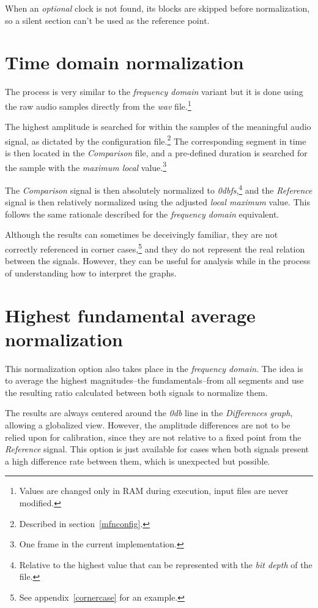 \documentclass[10pt,a4paper]{report}
\newcommand{\ac}[1]{\textit{\mbox{\acrshort{#1}}}}
\newcommand{\db}[1]{\textit{\mbox{#1\acrshort{db}}}}
\newcommand{\dbfs}[1]{\textit{\mbox{#1\acrshort{dbfs}}}}
\begin{document}
\begin{appendices}
When an \textit{optional} clock is not found, its blocks are skipped before normalization, so a silent section can't be used as the reference point.

\section{Time domain normalization}

The process is very similar to the \textit{frequency domain} variant but it is done using the raw audio samples directly from the \ac{wav} file.\footnote{Values are changed only in RAM during execution, input files are never modified.}

The highest amplitude is searched for within the samples of the meaningful audio signal, as dictated by the configuration file.\footnote{Described in section~\ref{mfnconfig}.} The corresponding segment in time is then located in the \textit{Comparison} file, and a pre-defined duration is searched for the sample with the \textit{maximum local} value.\footnote{One frame in the current implementation.}

The \textit{Comparison} signal is then absolutely normalized to \dbfs{0},\footnote{Relative to the highest value that can be represented with the \textit{bit depth} of the file.} and the \textit{Reference} signal is then relatively normalized using the adjusted \textit{local maximum} value. This follows the same rationale described for the \textit{frequency domain} equivalent.

Although the results can sometimes be deceivingly familiar, they are not correctly referenced in corner cases,\footnote{See appendix~\ref{cornercase} for an example.} and they do not represent the real relation between the signals. However, they can be useful for analysis while in the process of understanding how to interpret the graphs.

\section{Highest fundamental average normalization}

This normalization option also takes place in the \textit{frequency domain}. The idea is to average the highest magnitudes--the fundamentals--from all segments and use the resulting ratio calculated between both signals to normalize them.

The results are always centered around the \db{0} line in the \textit{Differences graph}, allowing a globalized view. However, the amplitude differences are not to be relied upon for calibration, since they are not relative to a fixed point from the \textit{Reference} signal. This option is just available for cases when both signals present a high difference rate between them, which is unexpected but possible.


\end{appendices}
\end{document}
